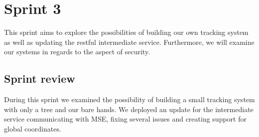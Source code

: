 \chapter{Sprint 3}\label{cha:sprint3}
This sprint aims to explore the possibilities of building our own tracking system as well as updating the restful intermediate service. Furthermore, we will examine our systems in regards to the aspect of security.




\section{Sprint review}
During this sprint we examined the possibility of building a small tracking system with only a tree and our bare hands. We deployed an update for the intermediate service communicating with MSE, fixing several issues and creating support for global coordinates. 